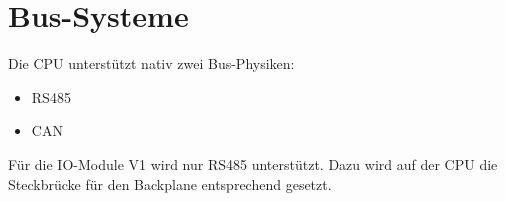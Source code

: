 \chapter{Bus-Systeme}
Die CPU unterstützt nativ zwei Bus-Physiken:
\begin{itemize}
    \item RS485
    \item CAN
\end{itemize}

Für die IO-Module V1 wird nur RS485 unterstützt. Dazu wird auf der CPU die Steckbrücke für den Backplane entsprechend gesetzt.




